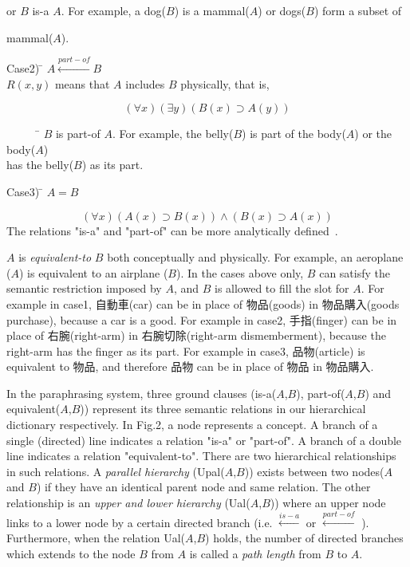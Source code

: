 or $B$ is-a $A$. For example, a dog($B$) is a mammal($A$) or dogs($B$)
form a subset of 

mammal($A$).
\begin{tabbing}
 Case2)  \= $A \stackrel{part-of}{\leftarrow} B$\\
         \> $R(x,y)$ means that $A$ includes $B$ physically, that is,
\end{tabbing}
\begin{equation}
            (\forall x)(\exists y)(B(x)\supset A(y))
\end{equation}
\begin{tabbing}
\ \ \ \ \ \ \= $B$ is part-of $A$. For example, the belly($B$) is 
part of the body($A$) or the body($A$)\\
            \> has the belly($B$) as its part.
\end{tabbing}
\begin{tabbing}
 Case3)  \= $A = B$
\end{tabbing}
\begin{equation}
            (\forall x)(A(x)\supset B(x)) \wedge (B(x)\supset A(x))
\end{equation}
The relations "is-a" and "part-of" can be more analytically defined~\cite{Yokota94}. 

$A$ is {\it equivalent-to} $B$ both conceptually and physically. For
example, an aeroplane ($A$) is equivalent to an airplane ($B$). In the
cases above only, $B$ can satisfy the semantic restriction imposed by
$A$, and $B$ is allowed to fill the slot for $A$. For example in
case1, 自動車(car) can be in place of 物品(goods) in 物品購入(goods
purchase), because a car is a good. For example in case2, 手指(finger)
can be in place of 右腕(right-arm) in 右腕切除(right-arm
dismemberment), because the right-arm has the finger as its part. For
example in case3, 品物(article) is equivalent to 物品, and therefore 
品物 can be in place of 物品 in 物品購入.

 In the paraphrasing system, three ground clauses (is-a($A$,$B$),
part-of($A$,$B$) and equivalent($A$,$B$)) represent its three semantic
relations in our hierarchical dictionary respectively. In Fig.2, a
node represents a concept. A branch of a single (directed) line
indicates a relation "is-a" or "part-of". A branch of a double line
indicates a relation "equivalent-to". There are two hierarchical
relationships in such relations.  A {\it parallel hierarchy}
(Upal($A$,$B$)) exists between two nodes($A$ and $B$) if they have an
identical parent node and same relation. The other relationship is an
{\it upper and lower hierarchy} (Ual($A$,$B$)) where an upper node
links to a lower node by a certain directed branch (i.e.
$\stackrel{is-a}{\leftarrow}$ or $\stackrel{part-of}{\leftarrow}$ ).
Furthermore, when the relation Ual($A$,$B$) holds, the number of
directed branches which extends to the node $B$ from $A$ is called a
{\it path length} from $B$ to $A$.

